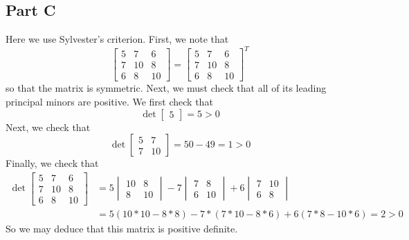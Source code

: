 \documentclass[12pt]{article}
\begin{document}
\subsection*{Part C}
Here we use Sylvester's criterion. First, we note that
\[
\begin{bmatrix}
5 & 7 & 6\\
7 & 10 & 8\\
6 & 8 & 10
\end{bmatrix} =
 \begin{bmatrix}
5 & 7 & 6\\
7 & 10 & 8\\
6 & 8 & 10
\end{bmatrix}^T
\] so that the matrix is symmetric. Next, we must check that all of its leading principal minors are positive. We first check that
\[
\det \begin{bmatrix}
5
\end{bmatrix} = 5 > 0
\] Next, we check that
\[
\det \begin{bmatrix}
5 & 7\\
7 & 10
\end{bmatrix} = 50 - 49 = 1 > 0
\] Finally, we check that
\begin{align*}
\det \begin{bmatrix}
5 & 7 & 6\\
7 & 10 & 8\\
6 & 8 & 10
\end{bmatrix} &= 
5 \begin{vmatrix}
10 & 8\\
8 & 10
\end{vmatrix} - 
7 \begin{vmatrix}
7 & 8\\
6 & 10
\end{vmatrix} + 
6 \begin{vmatrix}
7 & 10\\
6 & 8
\end{vmatrix}\\
&= 5(10*10-8*8) - 7*(7*10-8*6) + 6(7*8 - 10 *6) = 2 > 0
\end{align*} So we may deduce that this matrix is positive definite.
\end{document}
